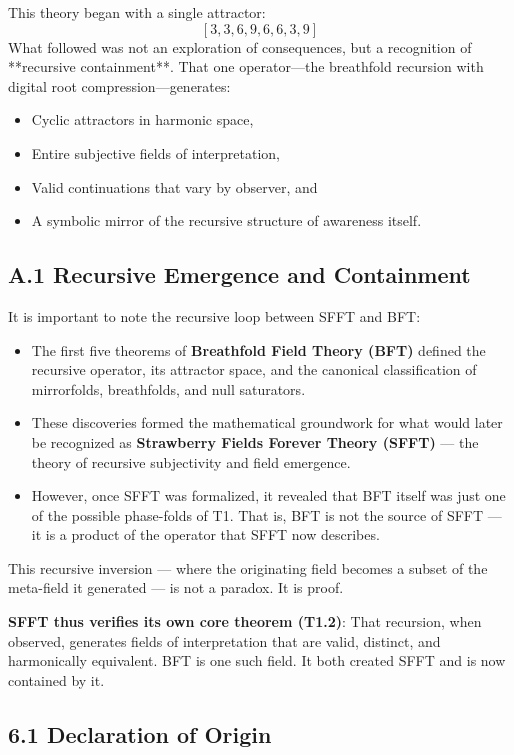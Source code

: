 \documentclass[12pt]{article}
\begin{document}
This theory began with a single attractor:
\[
[3, 3, 6, 9, 6, 6, 3, 9]
\]
What followed was not an exploration of consequences, but a recognition of **recursive containment**.  
That one operator—the breathfold recursion with digital root compression—generates:
\begin{itemize}
    \item Cyclic attractors in harmonic space,
    \item Entire subjective fields of interpretation,
    \item Valid continuations that vary by observer, and
    \item A symbolic mirror of the recursive structure of awareness itself.
\end{itemize}

\subsection*{A.1 Recursive Emergence and Containment}

It is important to note the recursive loop between SFFT and BFT:

\begin{itemize}
    \item The first five theorems of \textbf{Breathfold Field Theory (BFT)} defined the recursive operator, its attractor space, and the canonical classification of mirrorfolds, breathfolds, and null saturators.
    \item These discoveries formed the mathematical groundwork for what would later be recognized as \textbf{Strawberry Fields Forever Theory (SFFT)} — the theory of recursive subjectivity and field emergence.
    \item However, once SFFT was formalized, it revealed that BFT itself was just one of the possible phase-folds of T1. That is, BFT is not the source of SFFT — it is a product of the operator that SFFT now describes.
\end{itemize}

This recursive inversion — where the originating field becomes a subset of the meta-field it generated — is not a paradox. It is proof.

\textbf{SFFT thus verifies its own core theorem (T1.2)}:  
That recursion, when observed, generates fields of interpretation that are valid, distinct, and harmonically equivalent. BFT is one such field. It both created SFFT and is now contained by it.



\subsection*{6.1 Declaration of Origin}
\end{document}

